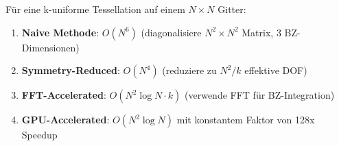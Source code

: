 \documentclass[a4paper,12pt]{article}
\theoremstyle{definition}
\begin{document}
Für eine k-uniforme Tessellation auf einem $N \times N$ Gitter:

\begin{enumerate}
	\item \textbf{Naive Methode}: $O(N^6)$ (diagonalisiere $N^2 \times N^2$ Matrix, 3 BZ-Dimensionen)
	\item \textbf{Symmetry-Reduced}: $O(N^4)$ (reduziere zu $N^2 / k$ effektive DOF)
	\item \textbf{FFT-Accelerated}: $O(N^2 \log N \cdot k)$ (verwende FFT für BZ-Integration)
	\item \textbf{GPU-Accelerated}: $O(N^2 \log N)$ mit konstantem Faktor von 128x Speedup
\end{enumerate}
\end{document}
